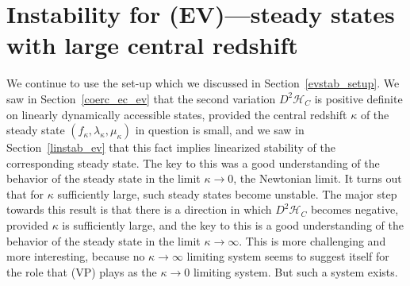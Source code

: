 \documentclass[11pt]{article}
\begin{document}
\section{Instability for (EV)---steady states with large central redshift}
\label{stabkappalarge}
\setcounter{equation}{0}
%
We continue to use the set-up which we discussed in Section~\ref{evstab_setup}.
We saw in Section~\ref{coerc_ec_ev} that the second variation
$D^2\mathcal{H}_C$ is positive definite on linearly dynamically accessible
states, provided the central redshift $\kappa$ of the steady state
$(f_\kappa,\lambda_\kappa,\mu_\kappa)$ in question is small, and we saw in
Section~\ref{linstab_ev} that this fact implies linearized stability
of the corresponding steady state. The key to this was a good understanding
of the behavior of the steady state in the limit $\kappa\to 0$,
the Newtonian limit. It turns out that for $\kappa$ sufficiently large,
such steady states become unstable. The major step towards this result
is that there is a direction in which $D^2\mathcal{H}_C$ becomes negative,
provided $\kappa$ is sufficiently large, and the key to this is a good
understanding of the behavior of the steady state in the limit
$\kappa\to \infty$. This is more challenging and more interesting,
because no $\kappa\to\infty$ limiting system seems to suggest itself for
the role that (VP) plays as the $\kappa\to 0$ limiting system.
But such a system exists.
%
\end{document}
